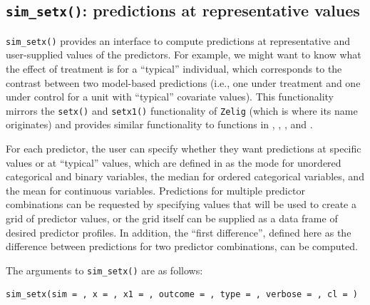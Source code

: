 \subsection{\texorpdfstring{\texttt{sim\_setx()}: predictions at representative values}{sim\_setx(): predictions at representative values}}\label{sim_setx-predictions-at-representative-values}

\texttt{sim\_setx()} provides an interface to compute predictions at representative and user-supplied values of the predictors. For example, we might want to know what the effect of treatment is for a ``typical'' individual, which corresponds to the contrast between two model-based predictions (i.e., one under treatment and one under control for a unit with ``typical'' covariate values). This functionality mirrors the \texttt{setx()} and \texttt{setx1()} functionality of \texttt{Zelig} (which is where its name originates) and provides similar functionality to functions in , , , and .

For each predictor, the user can specify whether they want predictions at specific values or at ``typical'' values, which are defined in  as the mode for unordered categorical and binary variables, the median for ordered categorical variables, and the mean for continuous variables. Predictions for multiple predictor combinations can be requested by specifying values that will be used to create a grid of predictor values, or the grid itself can be supplied as a data frame of desired predictor profiles. In addition, the ``first difference'', defined here as the difference between predictions for two predictor combinations, can be computed.

The arguments to \texttt{sim\_setx()} are as follows:

\begin{verbatim}
sim_setx(sim = , x = , x1 = , outcome = , type = , verbose = , cl = )
\end{verbatim}

